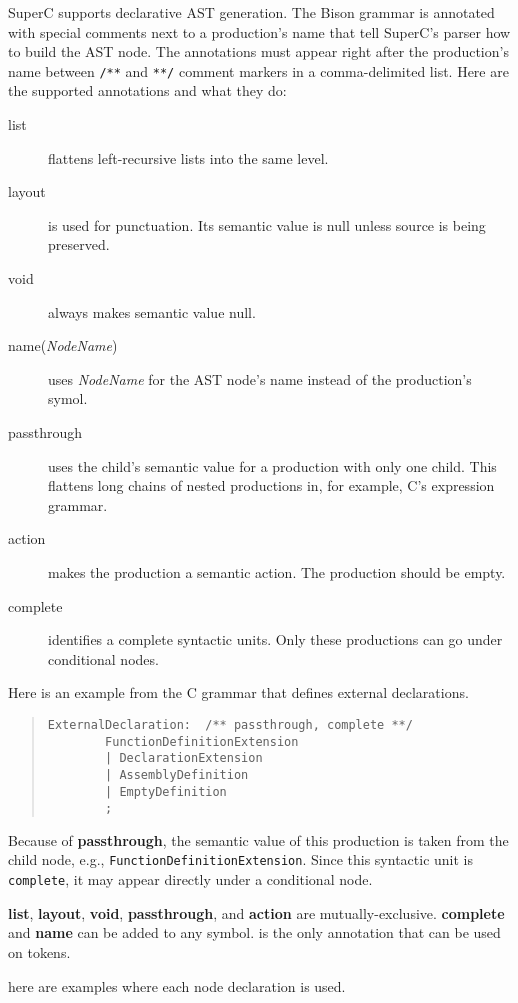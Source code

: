 \documentclass{article}
\begin{document}
SuperC supports declarative AST generation.  The Bison grammar is
annotated with special comments next to a production's name that tell
SuperC's parser how to build the AST node.  The annotations must
appear right after the production's name between \verb'/**' and
\verb'**/' comment markers in a comma-delimited list.  Here are the
supported annotations and what they do:
\begin{description}
\item[list] flattens left-recursive lists into the same level.
\item[layout] is used for punctuation.  Its semantic value is null
  unless source is being preserved.
\item[void] always makes semantic value null.
\item[name(\textit{NodeName})] uses \textit{NodeName} for the AST
  node's name instead of the production's symol.
\item[passthrough] uses the child's semantic value for a production
  with only one child.  This flattens long chains of nested
  productions in, for example, C's expression grammar.
\item[action] makes the production a semantic action.  The production
  should be empty.
\item[complete] identifies a complete syntactic units.  Only these
  productions can go under conditional nodes.
\end{description}
Here is an example from the C grammar that defines external
declarations.
\begin{quote}
\begin{verbatim}
ExternalDeclaration:  /** passthrough, complete **/
        FunctionDefinitionExtension
        | DeclarationExtension
        | AssemblyDefinition
        | EmptyDefinition
        ;
\end{verbatim}
\end{quote}
Because of \textbf{passthrough}, the semantic value of this production
is taken from the child node, e.g.,
\verb'FunctionDefinitionExtension'.  Since this syntactic unit is
\verb'complete', it may appear directly under a conditional node.

\textbf{list}, \textbf{layout}, \textbf{void}, \textbf{passthrough},
and \textbf{action} are mutually-exclusive.  \textbf{complete} and
\textbf{name} can be added to any symbol.   is the only
annotation that can be used on tokens.

here are examples where each node declaration is used.
\end{document}

